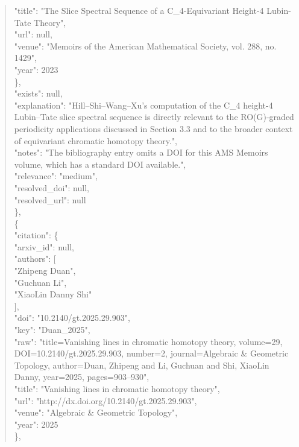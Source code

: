 \documentclass[11pt]{article}
\begin{document}
\begin{quote}
        "title": "The Slice Spectral Sequence of a C\_4-Equivariant Height-4 Lubin-Tate Theory",\\
        "url": null,\\
        "venue": "Memoirs of the American Mathematical Society, vol. 288, no. 1429",\\
        "year": 2023\\
      \},\\
      "exists": null,\\
      "explanation": "Hill--Shi--Wang--Xu's computation of the C\_4 height-4 Lubin--Tate slice spectral sequence is directly relevant to the RO(G)-graded periodicity applications discussed in Section 3.3 and to the broader context of equivariant chromatic homotopy theory.",\\
      "notes": "The bibliography entry omits a DOI for this AMS Memoirs volume, which has a standard DOI available.",\\
      "relevance": "medium",\\
      "resolved\_doi": null,\\
      "resolved\_url": null\\
    \},\\
    \{\\
      "citation": \{\\
        "arxiv\_id": null,\\
        "authors": [\\
          "Zhipeng Duan",\\
          "Guchuan Li",\\
          "XiaoLin Danny Shi"\\
        ],\\
        "doi": "10.2140/gt.2025.29.903",\\
        "key": "Duan\_2025",\\
        "raw": "title=Vanishing lines in chromatic homotopy theory, volume=29, DOI=10.2140/gt.2025.29.903, number=2, journal=Algebraic \& Geometric Topology, author=Duan, Zhipeng and Li, Guchuan and Shi, XiaoLin Danny, year=2025, pages=903--930",\\
        "title": "Vanishing lines in chromatic homotopy theory",\\
        "url": "http://dx.doi.org/10.2140/gt.2025.29.903",\\
        "venue": "Algebraic \& Geometric Topology",\\
        "year": 2025\\
      \},\\

\end{quote}
\end{document}
